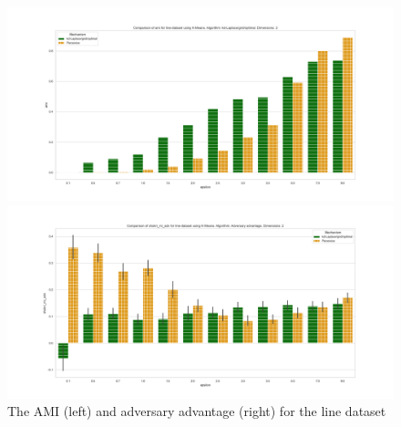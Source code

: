 \begin{figure}[H]
    \begin{minipage}[c]{0.55\textwidth}
        \includegraphics[width=\textwidth]{Results/RQ3/line-dataset/ami_line-dataset_comparison.png}
    \end{minipage}
    \begin{minipage}[c]{0.55\textwidth}
        \includegraphics[width=\textwidth]{Results/RQ3/line-dataset/shokri_mi_adv_line-dataset_comparison.png}
    \end{minipage}
    \label{fig:advantage_line-dataset_comparison}
    \caption{The AMI (left) and adversary advantage (right) for the line dataset}
\end{figure}

